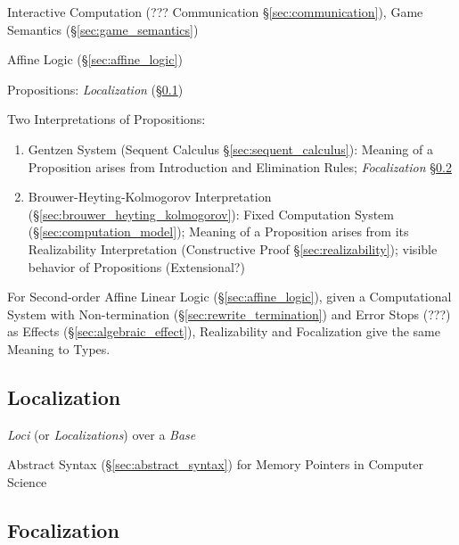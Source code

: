 \cite{girard01}

Interactive Computation (??? Communication \S\ref{sec:communication}),
Game Semantics (\S\ref{sec:game_semantics})

Affine Logic (\S\ref{sec:affine_logic})

Propositions: \emph{Localization} (\S\ref{sec:localization})

Two Interpretations of Propositions:

\begin{enumerate}
  \item Gentzen System (Sequent Calculus
    \S\ref{sec:sequent_calculus}): Meaning of a Proposition arises
    from Introduction and Elimination Rules; \emph{Focalization}
    \S\ref{sec:focalization}

  \item Brouwer-Heyting-Kolmogorov Interpretation
    (\S\ref{sec:brouwer_heyting_kolmogorov}): Fixed Computation System
    (\S\ref{sec:computation_model}); Meaning of a Proposition arises
    from its Realizability Interpretation (Constructive Proof
    \S\ref{sec:realizability}); visible behavior of Propositions
    (Extensional?)
\end{enumerate}

For Second-order Affine Linear Logic (\S\ref{sec:affine_logic}), given
a Computational System with Non-termination
(\S\ref{sec:rewrite_termination}) and Error Stops (???) as Effects
(\S\ref{sec:algebraic_effect}), Realizability and Focalization give
the same Meaning to Types.



\subsection{Localization}\label{sec:localization}

\emph{Loci} (or \emph{Localizations}) over a \emph{Base}

Abstract Syntax (\S\ref{sec:abstract_syntax}) for Memory Pointers in
Computer Science



\subsection{Focalization}\label{sec:focalization}

